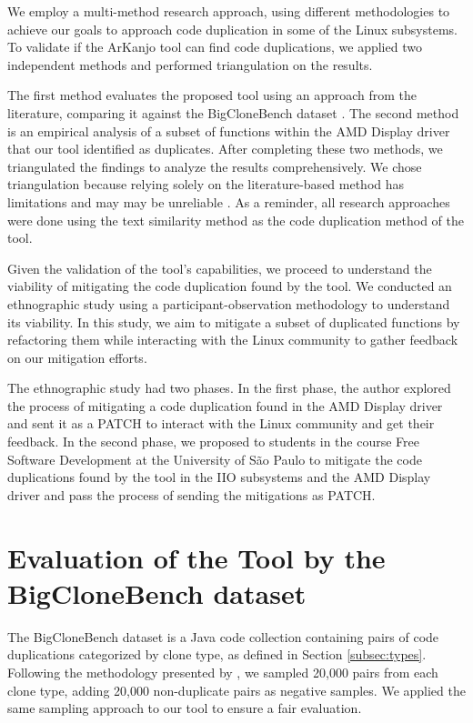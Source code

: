 We employ a multi-method research approach, using different methodologies to achieve our 
goals to approach code duplication in some of the Linux subsystems. To validate if the 
ArKanjo tool can find code duplications, we applied two independent methods and performed 
triangulation on the results.

The first method evaluates the proposed tool using an approach from the literature, 
comparing it against the BigCloneBench dataset \citep{bigclonebench}. 
The second method is an empirical analysis of a subset of functions within the 
AMD Display driver that our tool identified as duplicates. After completing these two 
methods, we triangulated the findings to analyze the results comprehensively. 
We chose triangulation because relying solely on the literature-based method has 
limitations and may may be unreliable \citep{bigfail, litreview}. 
As a reminder, all research approaches were done using the text similarity method 
as the code duplication method of the tool.

Given the validation of the tool’s capabilities, we proceed to understand the viability 
of mitigating the code duplication found by the tool. We conducted an ethnographic study 
using a participant-observation methodology to understand its viability. In this study, 
we aim to mitigate a subset of duplicated functions by refactoring them while interacting 
with the Linux community to gather feedback on our mitigation efforts.

The ethnographic study had two phases. In the first phase, the author explored the process 
of mitigating a code duplication found in the AMD Display driver and sent it as a PATCH to 
interact with the Linux community and get their feedback. In the second phase, we proposed 
to students in the course Free Software Development at the University of São Paulo to mitigate 
the code duplications found by the tool in the IIO subsystems and the AMD Display driver and 
pass the process of sending the mitigations as PATCH.

\section{Evaluation of the Tool by the BigCloneBench dataset}

\label{sec:metbig}

The BigCloneBench dataset \citep{bigclonebench} is a Java code collection containing pairs of code duplications categorized by clone type, as defined in Section \ref{subsec:types}.
%
Following the methodology presented by \citep{tailor}, we sampled 20,000 pairs from each clone type, adding 20,000 non-duplicate pairs as negative samples. We applied the same sampling approach to our tool to ensure a fair evaluation.

